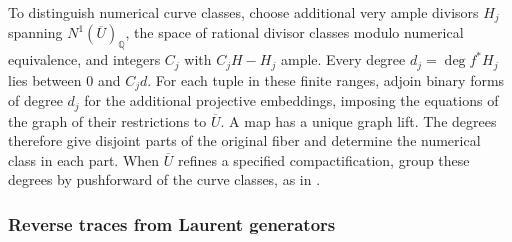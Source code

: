\documentclass[11pt,reqno]{amsart}
\numberwithin{equation}{section}
\theoremstyle{definition}
\theoremstyle{remark}
\begin{document}
To distinguish numerical curve classes, choose additional very ample
divisors \(H_j\) spanning \(N^1(\overline U)_{\mathbb Q}\), the space
of rational divisor classes modulo numerical equivalence, and integers
\(C_j\) with \(C_jH-H_j\) ample. Every degree \(d_j=\deg f^*H_j\)
lies between \(0\) and \(C_jd\). For each tuple in these finite ranges,
adjoin binary forms of degree \(d_j\) for the additional projective
embeddings, imposing the equations of the graph of their restrictions
to \(\overline U\). A map has a unique graph lift. The degrees therefore give
disjoint parts of the original fiber and determine the numerical class
in each part. When \(\overline U\) refines a specified compactification, group
these degrees by pushforward of the curve classes, as in
\cite[Proposition~17.3]{KY}.

\subsubsection{Reverse traces from Laurent generators}
\end{document}
